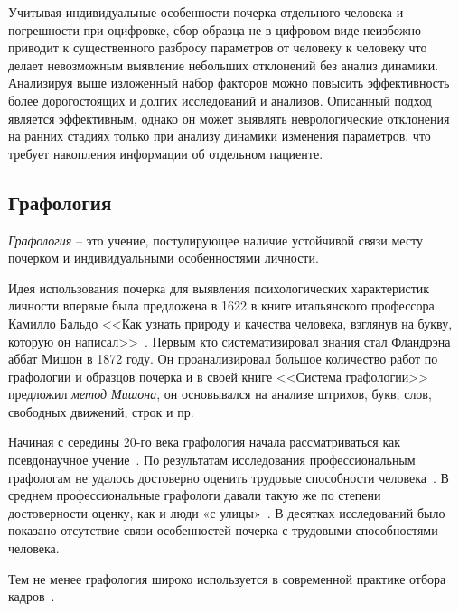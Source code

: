Учитывая индивидуальные особенности почерка отдельного человека и погрешности при оцифровке, сбор образца не в цифровом виде неизбежно приводит к существенного разбросу параметров от человеку к человеку что делает невозможным выявление небольших отклонений без анализ динамики.
Анализируя выше изложенный набор факторов можно повысить эффективность более дорогостоящих и долгих исследований и анализов.
Описанный подход является эффективным, однако он может выявлять неврологические отклонения на ранних стадиях только при анализу динамики изменения параметров, что требует накопления информации об отдельном пациенте.

\subsection{Графология}
\label{sub:domain:grafologic}
\emph{Графология} -- это учение, постулирующее наличие устойчивой связи месту почерком и индивидуальными особенностями личности.

Идея использования почерка для выявления психологических характеристик личности впервые была предложена в 1622 в книге итальянского профессора Камилло Бальдо <<Как узнать природу и качества человека, взглянув на букву, которую он написал>>~\cite{kamillo_grafology}. Первым кто систематизировал знания стал Фландрэна аббат Мишон в 1872 году. Он проанализировал большое количество работ по графологии и образцов почерка и в своей книге <<Система графологии>> предложил \emph{метод Мишона}, он основывался на анализе штрихов, букв, слов, свободных движений, строк и пр.~\cite{mishon_grafology}

Начиная с середины 20-го века графология начала рассматриваться как псевдонаучное учение~\cite{wiki_graphology}. По результатам исследования профессиональным графологам не удалось достоверно оценить трудовые способности человека~\cite{what_your_handwriting}. В среднем профессиональные графологи давали такую же по степени достоверности оценку, как и люди «с улицы»~\cite{neter_shakhar_psevdograph, king_koehler_psevdograph}. В десятках исследований было показано отсутствие связи особенностей почерка с трудовыми способностями человека.

Тем не менее графология широко используется в современной практике отбора кадров~\cite{graphology_psyfactor}.

